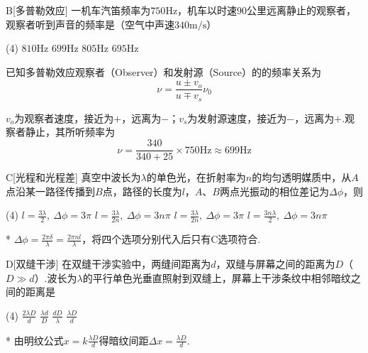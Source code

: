 \begin{choice}{B}[多普勒效应]
    一机车汽笛频率为$750\mathrm{Hz}$，机车以时速$90$公里远离静止的观察者，观察者听到声音的频率是（空气中声速$340\mathrm{m/s}$）
    \begin{tasks}(4)
        \task $810\mathrm{Hz}$
        \task $699\mathrm{Hz}$
        \task $805\mathrm{Hz}$
        \task $695\mathrm{Hz}$
    \end{tasks}
\end{choice}
\begin{solution}
    已知多普勒效应观察者（Observer）和发射源（Source）的的频率关系为
    \[\nu=\frac{u\pm v_o}{u\mp v_s}\nu_0\]

    $v_o$为观察者速度，接近为$+$，远离为$-$；$v_s$为发射源速度，接近为$-$，远离为$+$.观察者静止，其所听频率为
    \[\nu=\frac{340}{340+25}\times 750\mathrm{Hz}\approx 699\mathrm{Hz}\]

\end{solution}

\begin{choice}{C}[光程和光程差]
    真空中波长为$\lambda$的单色光，在折射率为$n$的均匀透明媒质中，从$A$点沿某一路径传播到$B$点，路径的长度为$l$，$A$、$B$两点光振动的相位差记为$\Delta\phi$，则
    \begin{tasks}(4)
        \task $l=\frac{3\lambda}{2},\ \Delta\phi=3\pi$
        \task $l=\frac{3\lambda}{2n},\ \Delta\phi=3n\pi$
        \task $l=\frac{3\lambda}{2n},\ \Delta\phi=3\pi$
        \task $l=\frac{3n\lambda}{2},\ \Delta\phi=3n\pi$
    \end{tasks}
\end{choice}
\begin{solution}*
    $\Delta\phi=\frac{2\pi\delta}{\lambda}=\frac{2\pi nl}{\lambda}$，将四个选项分别代入后只有C选项符合.
\end{solution}

\begin{choice}{D}[双缝干涉]
    在双缝干涉实验中，两缝间距离为$d$，双缝与屏幕之间的距离为$D$（$D\gg d$）.波长为$\lambda$的平行单色光垂直照射到双缝上，屏幕上干涉条纹中相邻暗纹之间的距离是
    \begin{tasks}(4)
        \task $\frac{2\lambda D}{d}$
        \task $\frac{\lambda d}{D}$
        \task $\frac{dD}{\lambda}$
        \task $\frac{\lambda D}{d}$
    \end{tasks}
\end{choice}
\begin{solution}*
    由明纹公式$x=k\frac{\lambda D}{d}$得暗纹间距$\Delta x=\frac{\lambda D}{d}$.
\end{solution}

